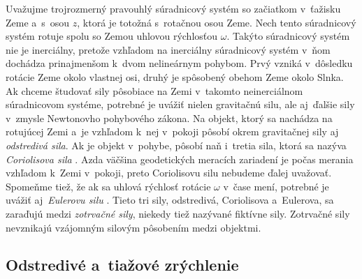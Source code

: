 \documentclass[a4paper,12pt]{book}
\begin{document}
Uvažujme trojrozmerný pravouhlý súradnicový systém so začiatkom v~ťažisku Zeme 
a~s~osou $z$, ktorá je totožná s~rotačnou osou Zeme.  Nech tento súradnicový 
systém rotuje spolu so Zemou uhlovou rýchlosťou $\omega$.  Takýto súradnicový 
systém nie je inerciálny, pretože vzhľadom na inerciálny súradnicový systém 
v~ňom dochádza prinajmenšom k~dvom nelineárnym pohybom.  Prvý vzniká v~dôsledku 
rotácie Zeme okolo vlastnej osi, druhý je spôsobený obehom Zeme okolo Slnka.  
Ak chceme študovať sily pôsobiace na Zemi v~takomto neinerciálnom súradnicovom 
systéme, potrebné je uvážiť nielen gravitačnú silu, ale aj~ďalšie sily v~zmysle 
Newtonovho pohybového zákona.  Na objekt, ktorý sa nachádza na rotujúcej Zemi 
a~je vzhľadom k~nej v~pokoji pôsobí okrem gravitačnej sily aj \emph{odstredivá 
sila}.  Ak je objekt v~pohybe, pôsobí naň i~tretia sila, ktorá sa nazýva 
\emph{Coriolisova sila} \parencite{Torge1989,SansoGeoidDetermination}.  Azda 
väčšina geodetických meracích zariadení je počas merania vzhľadom k~Zemi 
v~pokoji, preto Coriolisovu silu nebudeme ďalej uvažovať.  Spomeňme tiež, že ak 
sa uhlová rýchlosť rotácie $\omega$ v~čase mení, potrebné je uvážiť 
aj~\emph{Eulerovu silu} \parencite{Torge1989,SansoGeoidDetermination}.  Tieto 
tri sily, odstredivá, Coriolisova a~Eulerova, sa zaraďujú medzi \emph{zotrvačné 
sily}, niekedy tiež nazývané fiktívne sily.  Zotrvačné sily nevznikajú 
vzájomným silovým pôsobením medzi objektmi.






\subsection{Odstredivé a~tiažové zrýchlenie}
\label{sec:centrifugal_and_gravity_acceleration}
\end{document}
